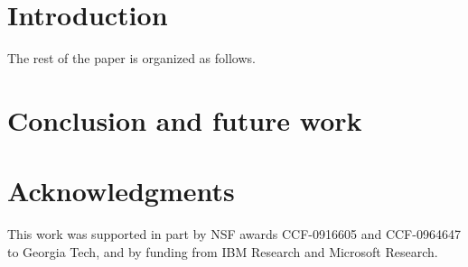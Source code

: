 \documentclass[conference]{IEEEtran}
\begin{document}



\section{Introduction}

\vspace{4pt}
The rest of the paper is organized as follows.  

\section{Conclusion and future work}
\label{sec:concl-future-work}


\section*{Acknowledgments}

This work was supported in part by NSF awards CCF-0916605 and
CCF-0964647 to Georgia Tech, and by funding from IBM Research and
Microsoft Research.



\end{document}

